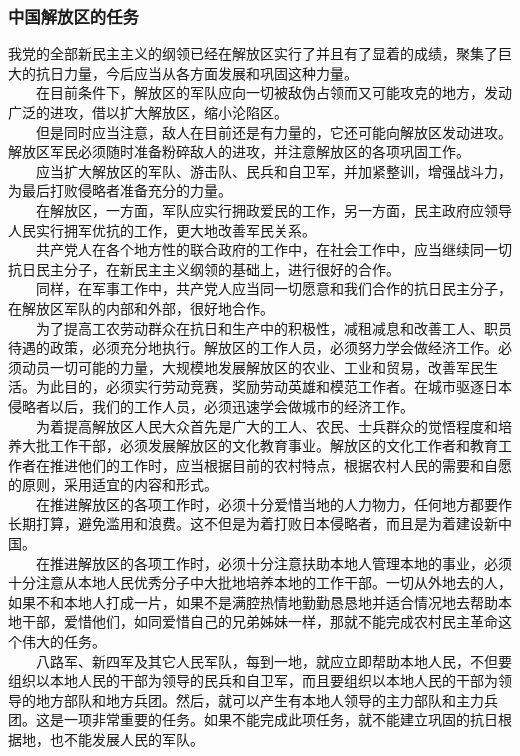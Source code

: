 \documentclass[cn,11pt,chinese]{elegantbook}
\def\myformat#1{\hfil\hfil #1}
\begin{document}
\subsubsection*{\myformat{中国解放区的任务}}
我党的全部新民主主义的纲领已经在解放区实行了并且有了显着的成绩，聚集了巨大的抗日力量，今后应当从各方面发展和巩固这种力量。\\
　　在目前条件下，解放区的军队应向一切被敌伪占领而又可能攻克的地方，发动广泛的进攻，借以扩大解放区，缩小沦陷区。\\
　　但是同时应当注意，敌人在目前还是有力量的，它还可能向解放区发动进攻。解放区军民必须随时准备粉碎敌人的进攻，并注意解放区的各项巩固工作。\\
　　应当扩大解放区的军队、游击队、民兵和自卫军，并加紧整训，增强战斗力，为最后打败侵略者准备充分的力量。\\
　　在解放区，一方面，军队应实行拥政爱民的工作，另一方面，民主政府应领导人民实行拥军优抗的工作，更大地改善军民关系。\\
　　共产党人在各个地方性的联合政府的工作中，在社会工作中，应当继续同一切抗日民主分子，在新民主主义纲领的基础上，进行很好的合作。\\
　　同样，在军事工作中，共产党人应当同一切愿意和我们合作的抗日民主分子，在解放区军队的内部和外部，很好地合作。\\
　　为了提高工农劳动群众在抗日和生产中的积极性，减租减息和改善工人、职员待遇的政策，必须充分地执行。解放区的工作人员，必须努力学会做经济工作。必须动员一切可能的力量，大规模地发展解放区的农业、工业和贸易，改善军民生活。为此目的，必须实行劳动竞赛，奖励劳动英雄和模范工作者。在城市驱逐日本侵略者以后，我们的工作人员，必须迅速学会做城市的经济工作。\\
　　为着提高解放区人民大众首先是广大的工人、农民、士兵群众的觉悟程度和培养大批工作干部，必须发展解放区的文化教育事业。解放区的文化工作者和教育工作者在推进他们的工作时，应当根据目前的农村特点，根据农村人民的需要和自愿的原则，采用适宜的内容和形式。\\
　　在推进解放区的各项工作时，必须十分爱惜当地的人力物力，任何地方都要作长期打算，避免滥用和浪费。这不但是为着打败日本侵略者，而且是为着建设新中国。\\
　　在推进解放区的各项工作时，必须十分注意扶助本地人管理本地的事业，必须十分注意从本地人民优秀分子中大批地培养本地的工作干部。一切从外地去的人，如果不和本地人打成一片，如果不是满腔热情地勤勤恳恳地并适合情况地去帮助本地干部，爱惜他们，如同爱惜自己的兄弟姊妹一样，那就不能完成农村民主革命这个伟大的任务。\\
　　八路军、新四军及其它人民军队，每到一地，就应立即帮助本地人民，不但要组织以本地人民的干部为领导的民兵和自卫军，而且要组织以本地人民的干部为领导的地方部队和地方兵团。然后，就可以产生有本地人领导的主力部队和主力兵团。这是一项非常重要的任务。如果不能完成此项任务，就不能建立巩固的抗日根据地，也不能发展人民的军队。\\
\end{document}

